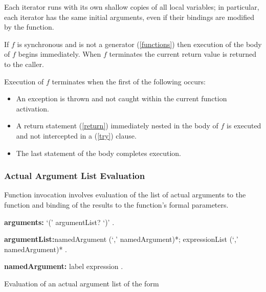 \documentclass{article}
\begin{document}
\LMHash{}
Each iterator runs with its own shallow copies of all local variables; in particular, each iterator has the same initial arguments, even if their bindings are modified by the function. 


\LMHash{}
If $f$ is synchronous and is not a generator (\ref{functions}) then execution of the body of $f$ begins immediately.  When $f$ terminates the current return value is returned to the caller.


\LMHash{}
Execution of $f$ terminates when the first of the following occurs:
\begin{itemize}
\item An exception is thrown and not caught within the current function activation. 
\item A return statement (\ref{return}) immediately nested in the body of $f$ is executed and not intercepted in a \FINALLY{} (\ref{try}) clause.
\item The last statement of the body completes execution.
\end{itemize}




\subsubsection{ Actual Argument List Evaluation}

\LMHash{}
Function invocation involves evaluation of the list of actual arguments to the function and binding of the results to the function's formal parameters.

\begin{grammar}
{\bf arguments:}
      `(' argumentList? `)'
    .

{\bf argumentList:}namedArgument (`,' namedArgument)*;
      expressionList (`,' namedArgument)*
    .

{\bf namedArgument:}
      label expression %
    .
 \end{grammar}

\LMHash{}
Evaluation of an actual argument list of the form 
\end{document}
